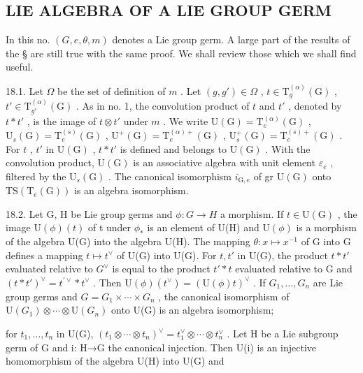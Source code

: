 \subsection{LIE ALGEBRA OF A LIE GROUP GERM}

In this no. \((G, e, \theta, m)\) denotes a Lie group germ. A large part of the results of the § are still true with the same proof. We shall review those which we shall find useful.

18.1. Let \(\Omega\) be the set of definition of \(m\) . Let \((g, g') \in \Omega\) , \(t \in \mathrm{T}_g^{(\alpha)}(\mathrm{G})\) , \(t' \in \mathrm{T}_{g'}^{(\alpha)}(\mathrm{G})\) . As in no. 1, the convolution product of \(t\) and \(t'\) , denoted by \(t * t'\) , is the image of \(t \otimes t'\) under \(m\) . We write \(\mathrm{U}(\mathrm{G}) = \mathrm{T}_e^{(\alpha)}(\mathrm{G})\) , \(\mathrm{U}_s(\mathrm{G}) = \mathrm{T}_e^{(s)}(\mathrm{G})\) , \(\mathrm{U}^+(\mathrm{G}) = \mathrm{T}_e^{(\alpha)+}(\mathrm{G})\) , \(\mathrm{U}_s^+(\mathrm{G}) = \mathrm{T}_e^{(s)+}(\mathrm{G})\) . For \(t\) , \(t'\) in \(\mathrm{U}(\mathrm{G})\) , \(t * t'\) is defined and belongs to \(\mathrm{U}(\mathrm{G})\) . With the convolution product, \(\mathrm{U}(\mathrm{G})\) is an associative algebra with unit element \(\varepsilon_e\) , filtered by the \(\mathrm{U}_s(\mathrm{G})\) . The canonical isomorphism \(i_{\mathrm{G}, e}\) of gr \(\mathrm{U}(\mathrm{G})\) onto \(\mathrm{TS}(\mathrm{T}_e(\mathrm{G}))\) is an algebra isomorphism.

18.2. Let G, H be Lie group germs and \(\phi: G \to H\) a morphism. If \(t \in \mathrm{U}(\mathrm{G})\) , the image \(\mathrm{U}(\phi)(t)\) of t under \(\phi_{*}\) is an element of U(H) and \(\mathrm{U}(\phi)\) is a morphism of the algebra U(G) into the algebra U(H). The mapping \(\theta: x \mapsto x^{-1}\) of G into G defines a mapping \(t \mapsto t^{\vee}\) of U(G) into U(G). For \(t, t'\) in U(G), the product \(t * t'\) evaluated relative to \(G^{\vee}\) is equal to the product \(t' * t\) evaluated relative to G and \((t * t')^{\vee} = t^{\prime\vee} * t^\vee\) . Then \(\mathrm{U}(\phi)(t^{\vee}) = (\mathrm{U}(\phi)t)^{\vee}\) . If \(G_{1}, \ldots, G_{n}\) are Lie group germs and \(G = G_{1} \times \cdots \times G_{n}\) , the canonical isomorphism of \(\mathrm{U}(G_{1}) \otimes \cdots \otimes \mathrm{U}(G_{n})\) onto U(G) is an algebra isomorphism;

for \(t_{1},\ldots,t_{n}\) in U(G), \((t_{1}\otimes\cdots\otimes t_{n})^{\vee}=t_{1}^{\vee}\otimes\cdots\otimes t_{n}^{\vee}\) . Let H be a Lie subgroup germ of G and i: H→G the canonical injection. Then U(i) is an injective homomorphism of the algebra U(H) into U(G) and

